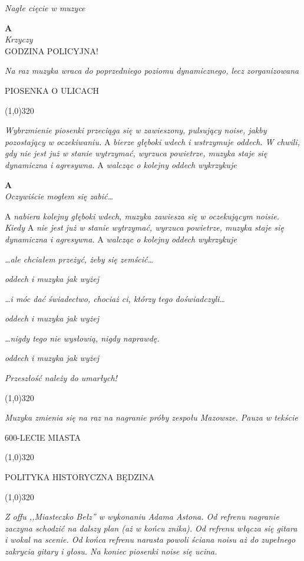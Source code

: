 \documentclass[11pt,a4paper,oneside]{article}
\begin{document}
{\color{light-gray} \emph{Nagłe cięcie w muzyce}}

\textbf{A}\\
{\color{light-gray} \emph{Krzyczy}}\\
GODZINA POLICYJNA!

{\color{light-gray} \emph{Na raz muzyka wraca do poprzedniego poziomu
dynamicznego, lecz zorganizowana}}

{\color{red}
PIOSENKA O ULICACH
}

\line(1,0){320}

{\color{light-gray} \emph{Wybrzmienie piosenki przeciąga się w zawieszony, pulsujący noise, jakby pozostający w oczekiwaniu.} A \emph{bierze głęboki wdech i wstrzymuje oddech. W chwili, gdy nie jest już w stanie wytrzymać, wyrzuca powietrze, muzyka staje się dynamiczna i agresywna.} A \emph{walcząc o kolejny oddech wykrzykuje}}

\textbf{A}\\
\emph{Oczywiście mogłem się zabić\dots{}} 

{\color{light-gray} A \emph{nabiera kolejny głęboki wdech, muzyka zawiesza się w oczekującym noisie. Kiedy} A \emph{nie jest już w stanie wytrzymać, wyrzuca powietrze, muzyka staje się dynamiczna i agresywna.} A \emph{walcząc o kolejny oddech wykrzykuje}}

\emph{\dots{}ale chciałem przeżyć, żeby się zemścić\dots{}}

{\color{light-gray} \emph{oddech i muzyka jak wyżej}}

\emph{\dots{}i móc dać świadectwo, chociaż ci, którzy tego doświadczyli\dots{}}

{\color{light-gray} \emph{oddech i muzyka jak wyżej}}

\emph{\dots{}nigdy tego nie wysłowią, nigdy naprawdę.}

{\color{light-gray} \emph{oddech i muzyka jak wyżej}}

\emph{Przeszłość należy do umarłych!}

\line(1,0){320}

{\color{light-gray} \emph{Muzyka zmienia się na raz na nagranie próby zespołu Mazowsze. Pauza w tekście}}


{\color{red}
600-LECIE MIASTA
}

\line(1,0){320}

{\color{red}
POLITYKA HISTORYCZNA BĘDZINA
}

\line(1,0){320}

{\color{light-gray} \emph{Z offu ,,Miasteczko Bełz'' w wykonaniu Adama Astona. Od refrenu nagranie zaczyna schodzić na dalszy plan (aż w końcu znika). Od refrenu włącza się gitara i wokal na scenie. Od końca refrenu narasta powoli ściana noisu aż do zupełnego zakrycia gitary i głosu. Na koniec piosenki noise się ucina.}}
\end{document}
